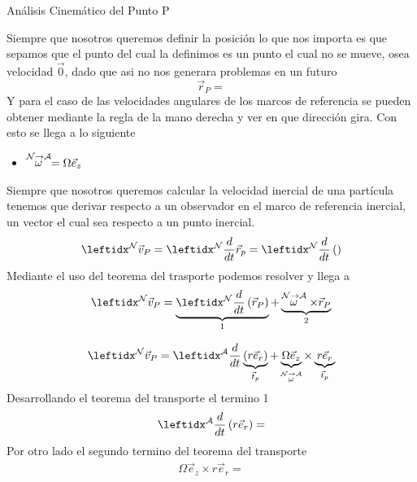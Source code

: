 \begin{sol}
\begin{cinematicaUnificada}{Análisis Cinemático del Punto P}
        
        Siempre que nosotros queremos definir la posición lo que nos importa es que sepamos que el punto del cual la definimos es un punto el cual no se mueve, osea velocidad $\vec{0}$, dado que asi no nos generara problemas en un futuro
        \begin{equation}
            \vec{r}_P=
        \end{equation}
        Y para el caso de las velocidades angulares de los marcos de referencia se pueden obtener mediante la regla de la mano derecha y ver en que dirección gira. Con esto se llega a lo siguiente
        \begin{itemize}
            \item $\stackrel{\mathcal{N} \to \mathcal{A}}{\omega}=\Omega\vec{e}_z$
        \end{itemize}

        Siempre que nosotros queremos calcular la velocidad inercial de una partícula tenemos que derivar respecto a un observador en el marco de referencia inercial, un vector el cual sea respecto a un punto inercial.
        \begin{equation}
            \marc{}{N}\vec{v}_P=\der{}{N}\vec{r}_p=\der{}{N}\left(\right)
        \end{equation}
        Mediante el uso del teorema del trasporte podemos resolver y llega a 
        \begin{equation}
            \marc{}{N}\vec{v}_P=\transportad{\vec{r}_P}{N}{A}
        \end{equation}
        
        
        
        \begin{equation}
            \marc{}{N}\vec{v}_P=\transD{r\vec{e}_r}{\Omega\vec{e}_z}{N}{A}{\vec{t}_p}
        \end{equation}
        Desarrollando el teorema del transporte el termino 1
        \begin{align}
            \der{}{A}\left(r\vec{e}_r\right)=
        \end{align}
        Por otro lado el segundo termino del teorema del transporte
        \begin{align}
            \Omega\vec{e}_z\times r\vec{e}_r=
        \end{align}


\end{cinematicaUnificada}
\end{sol}
